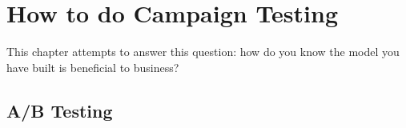 \section{How to do Campaign Testing}

This chapter attempts to answer this question: how do you know the model you have built is beneficial to business?

\subsection{A/B Testing}

\newpage